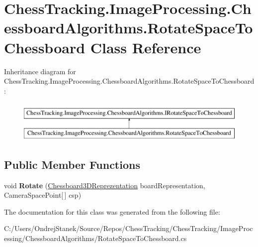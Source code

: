 \hypertarget{class_chess_tracking_1_1_image_processing_1_1_chessboard_algorithms_1_1_rotate_space_to_chessboard}{}\section{Chess\+Tracking.\+Image\+Processing.\+Chessboard\+Algorithms.\+Rotate\+Space\+To\+Chessboard Class Reference}
\label{class_chess_tracking_1_1_image_processing_1_1_chessboard_algorithms_1_1_rotate_space_to_chessboard}
Inheritance diagram for Chess\+Tracking.\+Image\+Processing.\+Chessboard\+Algorithms.\+Rotate\+Space\+To\+Chessboard\+:\begin{figure}[H]
\begin{center}
\leavevmode
\includegraphics[height=2.000000cm]{class_chess_tracking_1_1_image_processing_1_1_chessboard_algorithms_1_1_rotate_space_to_chessboard}
\end{center}
\end{figure}
\subsection*{Public Member Functions}
\begin{DoxyCompactItemize}
\item 
\mbox{\label{class_chess_tracking_1_1_image_processing_1_1_chessboard_algorithms_1_1_rotate_space_to_chessboard_ae0c68ec5694df63717e48778e7f8bde1}} 
void {\bfseries Rotate} (\mbox{\hyperlink{class_chess_tracking_1_1_image_processing_1_1_chessboard_algorithms_1_1_chessboard3_d_reprezentation}{Chessboard3\+D\+Reprezentation}} board\+Representation, Camera\+Space\+Point\mbox{[}$\,$\mbox{]} csp)
\end{DoxyCompactItemize}


The documentation for this class was generated from the following file\+:\begin{DoxyCompactItemize}
\item 
C\+:/\+Users/\+Ondrej\+Stanek/\+Source/\+Repos/\+Chess\+Tracking/\+Chess\+Tracking/\+Image\+Processing/\+Chessboard\+Algorithms/Rotate\+Space\+To\+Chessboard.\+cs\end{DoxyCompactItemize}
